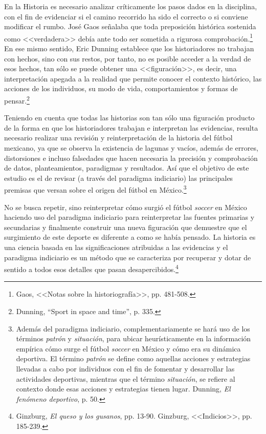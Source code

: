 \documentclass[11pt,a5paper,twoside]{book} %
\begin{document}
En la Historia es necesario analizar críticamente los pasos dados en la disciplina, con
el fin de evidenciar si el camino recorrido ha sido el correcto o si conviene modificar el
rumbo. José Gaos señalaba que toda preposición histórica sostenida como <<verdadera>> debía
ante todo ser sometida a rigurosa comprobación.\footnote{Gaos, <<Notas sobre la historiografía>>, pp. 481-508.} En ese mismo sentido, Eric Dunning
establece que los historiadores no trabajan con hechos, sino con sus restos, por tanto, no es
posible acceder a la verdad de esos hechos, tan sólo se puede obtener una <<figuración>>, es decir, una interpretación apegada a la realidad que permite conocer el contexto histórico, las
acciones de los individuos, su modo de vida, comportamientos y formas de pensar.\footnote{Dunning, ``Sport in space and time'', p. 335.}

Teniendo en cuenta que todas las historias son tan sólo una figuración producto de la
forma en que los historiadores trabajan e interpretan las evidencias, resulta necesario realizar
una revisión y reinterpretación de la historia del fútbol mexicano, ya que se observa la
existencia de lagunas y vacíos, además de errores, distorsiones e incluso falsedades que hacen
necesaria la precisión y comprobación de datos, planteamientos, paradigmas y resultados.
Así que el objetivo de este estudio es el de revisar (a través del paradigma indiciario) las
principales premisas que versan sobre el origen del fútbol en México.\footnote{Además del paradigma indiciario, complementariamente se hará uso de los términos \emph{patrón} y \emph{situación}, para ubicar heurísticamente en la información empírica cómo surge el fútbol \emph{soccer} en México y cómo era su dinámica deportiva. El término \emph{patrón} se define como aquellas acciones y estrategias llevadas a cabo por individuos con el fin de fomentar y desarrollar las actividades deportivas, mientras que el término \emph{situación}, se refiere al contexto donde esas acciones y estrategias tienen lugar. Dunning, \emph{El fenómeno deportivo}, p. 50.}

No se busca repetir, sino reinterpretar cómo surgió el fútbol \emph{soccer} en México
haciendo uso del paradigma indiciario para reinterpretar las fuentes primarias y secundarias
y finalmente construir una nueva figuración que demuestre que el surgimiento de este deporte
es diferente a como se había pensado. La historia es una ciencia basada en las significaciones
atribuidas a las evidencias y el paradigma indiciario es un método que se caracteriza por
recuperar y dotar de sentido a todos esos detalles que pasan desapercibidos.\footnote{Ginzburg, \emph{El queso y los gusanos}, pp. 13-90. Ginzburg, <<Indicios>>, pp. 185-239.}
\end{document}

